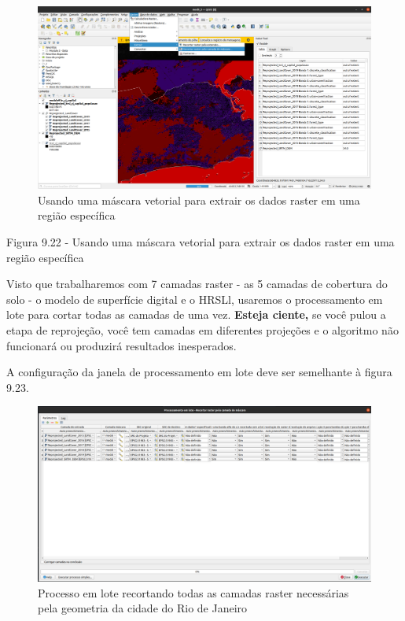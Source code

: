 \documentclass[
]{krantz}
\begin{document}
\begin{figure}
\centering
\includegraphics{media/modulo9/fig922.png}
\caption{Usando uma máscara vetorial para extrair os dados raster em uma região específica}
\end{figure}

Figura 9.22 - Usando uma máscara vetorial para extrair os dados raster em uma região específica

Visto que trabalharemos com 7 camadas raster - as 5 camadas de cobertura do solo - o modelo de superfície digital e o HRSLl, usaremos o processamento em lote para cortar todas as camadas de uma vez. \textbf{Esteja ciente,} se você pulou a etapa de reprojeção, você tem camadas em diferentes projeções e o algoritmo não funcionará ou produzirá resultados inesperados.

A configuração da janela de processamento em lote deve ser semelhante à figura 9.23.

\begin{figure}
\centering
\includegraphics{media/modulo9/fig923.png}
\caption{Processo em lote recortando todas as camadas raster necessárias pela geometria da cidade do Rio de Janeiro}
\end{figure}
\end{document}
